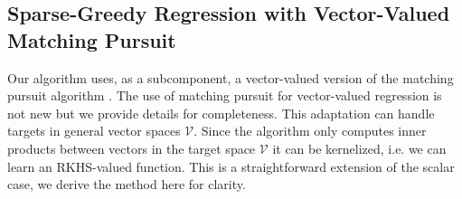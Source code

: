 \documentclass[letterpaper]{article}
\newcommand{\MallatMatchingPursuit}{DBLP:journals/tsp/MallatZ93}
\newcommand{\LeverPoliciesInRKHS}{DBLP:conf/aistats/LeverS15}
\newcommand{\cV}{{\mathcal V}}
\begin{document}
\subsection{Sparse-Greedy Regression with Vector-Valued Matching Pursuit}

Our algorithm uses, as a subcomponent, a vector-valued version of the matching pursuit algorithm \citep{\MallatMatchingPursuit}. The use of matching pursuit for vector-valued regression is not new \citep[see e.g.][]{\LeverPoliciesInRKHS} but we provide details for completeness. This adaptation can handle targets in general vector spaces $\cV$. Since the algorithm only computes inner products between vectors in the target space $\cV$ it can be kernelized, i.e. we can learn an RKHS-valued function. This is a straightforward extension of the scalar case, we derive the method here for clarity.
\end{document}
